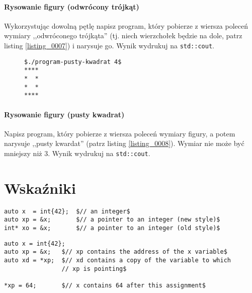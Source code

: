 \documentclass[11pt,a4paper,titlepage,onecolumn]{article}
\begin{document}
\paragraph{Rysowanie figury (odwrócony trójkąt)} Wykorzystując dowolną pętlę
napisz program, który pobierze z wiersza poleceń wymiary ,,odwróconego
trójkąta'' (tj.  niech wierzchołek będzie na dole, patrz listing
\ref{listing_0007}) i narysuje go. Wynik wydrukuj na \texttt{std::cout}.

\begin{figure}[!htp]
\begin{lstlisting}[caption={pusty kwardat},
    captionpos=b,
    label=listing_0008]
$./program-pusty-kwadrat 4$
****
*  *
*  *
****
\end{lstlisting}
\end{figure}

\paragraph{Rysowanie figury (pusty kwadrat)} Napisz program, który pobierze z
wiersza poleceń wymiary figury, a potem narysuje ,,pusty kwardat'' (patrz
listing \ref{listing_0008}). Wymiar nie może być mniejszy niż 3.
Wynik wydrukuj na \texttt{std::cout}.

\newpage
\section{Wskaźniki}

\begin{lstlisting}[caption={pobranie wskaźnika},
    captionpos=b,
    label=listing_howto_address_of]
auto x  = int{42};  $// an integer$
auto xp = &x;       $// a pointer to an integer (new style)$
int* xo = &x;       $// a pointer to an integer (old style)$
\end{lstlisting}

\begin{lstlisting}[caption={dereferencja wskaźnika},
    captionpos=b,
    label=listing_howto_pointer_dereference]
auto x = int{42};
auto xp = &x;   $// xp contains the address of the x variable$
auto xd = *xp;  $// xd contains a copy of the variable to which
                // xp is pointing$

*xp = 64;       $// x contains 64 after this assignment$
\end{lstlisting}
\end{document}
